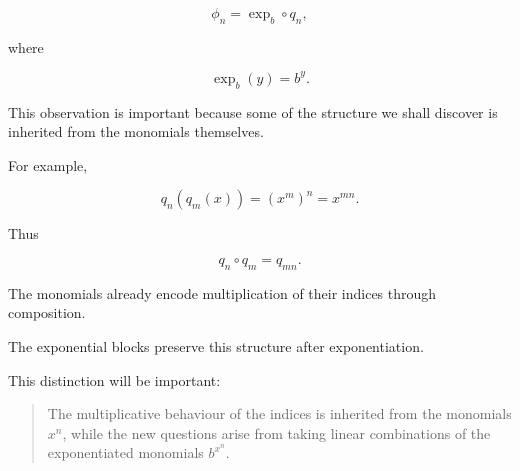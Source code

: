 \[
\boxed{
\phi_n=\exp_b\circ q_n,
}
\]

where

\[
\exp_b(y)=b^y.
\]

This observation is important because some of the structure we shall
discover is inherited from the monomials themselves.

For example,

\[
q_n(q_m(x))
=
(x^m)^n
=
x^{mn}.
\]

Thus

\[
\boxed{
q_n\circ q_m=q_{mn}.
}
\]

The monomials already encode multiplication of their indices through
composition.

The exponential blocks preserve this structure after exponentiation.

This distinction will be important:

\begin{quote}
The multiplicative behaviour of the indices is inherited from the
monomials \(x^n\), while the new questions arise from taking linear
combinations of the exponentiated monomials \(b^{x^n}\).
\end{quote}

